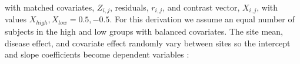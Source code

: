 with matched covariates, $Z_{i,j}$, residuals, $r_{i,j}$, and contrast vector, $X_{i,j}$, with values $X_{high}, X_{low} = 0.5,-0.5$. For this derivation we assume an equal number of subjects in the high and low groups with balanced covariates. The site mean, disease effect, and covariate effect randomly vary between sites so the intercept and slope coefficients become dependent variables \cite{Raudenbush2000}: